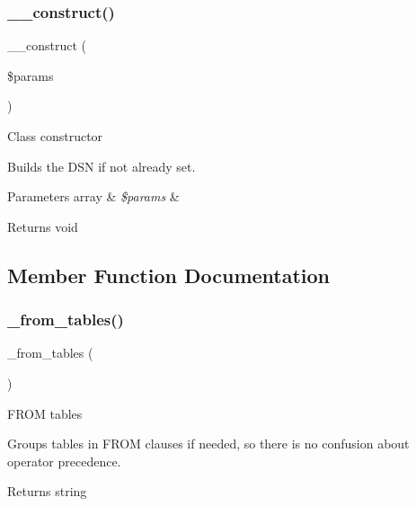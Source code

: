 \subsubsection{\texorpdfstring{\+\_\+\+\_\+construct()}{\_\_construct()}}
{\footnotesize\ttfamily \+\_\+\+\_\+construct (\begin{DoxyParamCaption}\item[{}]{\$params }\end{DoxyParamCaption})}

Class constructor

Builds the D\+SN if not already set.


\begin{DoxyParams}[1]{Parameters}
array & {\em \$params} & \\
\hline
\end{DoxyParams}
\begin{DoxyReturn}{Returns}
void 
\end{DoxyReturn}


\subsection{Member Function Documentation}
\mbox{\label{class_c_i___d_b__pdo__cubrid__driver_aef43f7e3e7b71d337ff3724c5eb14f10}} 
\subsubsection{\texorpdfstring{\+\_\+from\+\_\+tables()}{\_from\_tables()}}
{\footnotesize\ttfamily \+\_\+from\+\_\+tables (\begin{DoxyParamCaption}{ }\end{DoxyParamCaption})\hspace{0.3cm}{\ttfamily [protected]}}

F\+R\+OM tables

Groups tables in F\+R\+OM clauses if needed, so there is no confusion about operator precedence.

\begin{DoxyReturn}{Returns}
string 
\end{DoxyReturn}
\mbox{\label{class_c_i___d_b__pdo__cubrid__driver_a7ccb7f9c301fe7f0a9db701254142b63}} 
